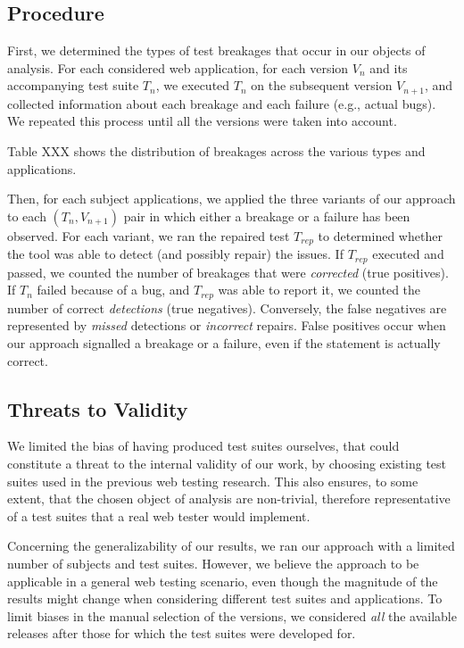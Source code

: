 \subsection{Procedure}\label{sec:procedure}

First, we determined the types of test breakages that occur in our objects of analysis. For each considered web application, for each version $V_n$ and its accompanying test suite $T_n$, we executed $T_n$ on the subsequent version $V_{n+1}$, and collected information about each breakage and each failure (e.g., actual bugs). We repeated this process until all the versions were taken into account. 

Table XXX shows the distribution of breakages across the various types and applications. 

Then, for each subject applications, we applied the three variants of our approach to each $(T_n,V_{n+1})$ pair in which either a breakage or a failure has been observed. For each variant, we ran the repaired test $T_{rep}$ to determined whether the tool was able to detect (and possibly repair) the issues. If $T_{rep}$ executed and passed, we counted the number of breakages that were \textit{corrected} (true positives). If $T_n$ failed because of a bug, and $T_{rep}$ was able to report it, we counted the number of correct \textit{detections} (true negatives). Conversely, the false negatives are represented by \textit{missed} detections or \textit{incorrect} repairs. False positives occur when our approach signalled a breakage or a failure, even if the statement is actually correct.


\subsection{Threats to Validity}\label{sec:ttv}

 We limited the bias of having produced test suites ourselves, that could constitute a threat to the internal validity of our work, by choosing existing test suites used in the previous web testing research. This also ensures, to some extent, that the chosen object of analysis are non-trivial, therefore representative of a test suites that a real web tester would implement. 

 Concerning the generalizability of our results, we ran our approach with a limited number of subjects and test suites. However, we believe the approach to be applicable in a general web testing scenario, even though the magnitude of the results might change when considering different test suites and applications. To limit biases in the manual selection of the versions, we considered \textit{all} the available releases after those for which the test suites were developed for.
 

